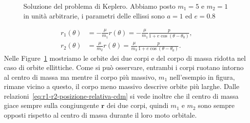 {\begin{figure}
  \pgfmathsetmacro{\auno}{\a*\mridotta/\muno} %
  \pgfmathsetmacro{\buno}{\b*\mridotta/\muno} %
  \pgfmathsetmacro{\cuno}{\auno*\e} %
  \pgfmathsetmacro{\adue}{\a*\mridotta/\mdue} %
  \pgfmathsetmacro{\bdue}{\b*\mridotta/\mdue} %
  \pgfmathsetmacro{\cdue}{\adue*\e} %
   \quad
  \caption[Soluzione del problema di Keplero]{Soluzione del problema di
    Keplero. Abbiamo posto $m_1=5$ e $m_2=1$ in unità arbitrarie, i parametri
    delle ellissi sono $a=1$ ed $e=0.8$}
  \label{fig:orbite-ellittiche}
\end{figure}
\begin{subequations}
  \begin{align}
    r_1(\theta) &= -\frac{\mu}{m_1}r(\theta) =
    -\frac{\mu}{m_1}\frac{p}{1+e\cos(\theta - \theta_0)},\\
    r_2(\theta) &= \frac{\mu}{m_2}r(\theta) =
    \frac{\mu}{m_2}\frac{p}{1+e\cos(\theta - \theta_0)}.
  \end{align}
\end{subequations}
Nelle Figure~\ref{fig:orbite-ellittiche} mostriamo le orbite dei due corpi e del
corpo di massa ridotta nel caso di orbite ellittiche. Come si può osservare,
entrambi i corpi ruotano intorno al centro di massa ma mentre il corpo più
massivo, $m_1$ nell'esempio in figura, rimane vicino a questo, il corpo meno
massivo descrive orbite più larghe. Dalle
relazioni~\eqref{eq:r1-r2-posizione-relativa-cdm} si vede inoltre che il centro
di massa giace sempre sulla congiungente $\bm{r}$ dei due corpi, quindi $m_1$ e
$m_2$ sono sempre opposti rispetto al centro di massa durante il loro moto
orbitale.

}
